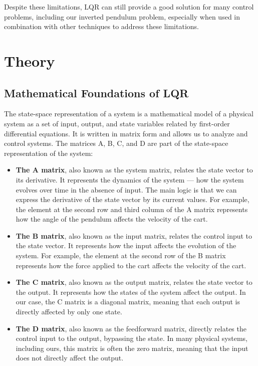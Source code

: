 \documentclass[11pt,twocolumn,twoside,lineno]{pnas-new}
\begin{document}
Despite these limitations, LQR can still provide a good solution for many control problems, including our inverted pendulum problem, especially when used in combination with other techniques to address these limitations.


\section{Theory}
\subsection{Mathematical Foundations of LQR}
The state-space representation of a system is a mathematical model of a physical system as a set of input, output, and state variables related by first-order differential equations. It is written in matrix form and allows us to analyze and control systems. The matrices A, B, C, and D are part of the state-space representation of the system:

\begin{itemize}
    \item \textbf{The A matrix}, also known as the system matrix, relates the state vector to its derivative. It represents the dynamics of the system — how the system evolves over time in the absence of input. The main logic is that we can express the derivative of the state vector by its current values. For example, the element at the second row and third column of the A matrix represents how the angle of the pendulum affects the velocity of the cart.
    \item \textbf{The B matrix}, also known as the input matrix, relates the control input to the state vector. It represents how the input affects the evolution of the system. For example, the element at the second row of the B matrix represents how the force applied to the cart affects the velocity of the cart.
    \item \textbf{The C matrix}, also known as the output matrix, relates the state vector to the output. It represents how the states of the system affect the output. In our case, the C matrix is a diagonal matrix, meaning that each output is directly affected by only one state.
    \item \textbf{The D matrix}, also known as the feedforward matrix, directly relates the control input to the output, bypassing the state. In many physical systems, including ours, this matrix is often the zero matrix, meaning that the input does not directly affect the output.
\end{itemize}
\end{document}
